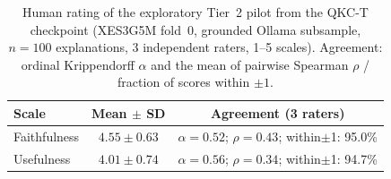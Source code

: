 ﻿\begin{table}[t]
\caption{Human rating of the exploratory Tier~2 pilot from the QKC-T checkpoint
(XES3G5M fold~0, grounded Ollama subsample, $n{=}100$ explanations,
3 independent raters, 1--5 scales). Agreement: ordinal Krippendorff
$\alpha$ and the mean of pairwise Spearman $\rho$ / fraction of scores
within $\pm 1$.}
\label{tab:human-eval}
\centering
\begin{tabular}{@{}lcc@{}}
\toprule
Scale & Mean $\pm$ SD & Agreement (3 raters) \\
\midrule
Faithfulness & $4.55 \pm 0.63$ & $\alpha{=}0.52$; $\rho{=}0.43$; within$\pm$1: 95.0\% \\
Usefulness & $4.01 \pm 0.74$ & $\alpha{=}0.56$; $\rho{=}0.34$; within$\pm$1: 94.7\% \\
\bottomrule
\end{tabular}
\end{table}
